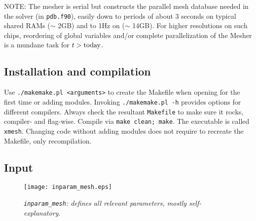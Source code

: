 \documentclass[11pt,letter,fleqn,english,notitlepage]{article}
\begin{document}
\noindent NOTE: The mesher is serial but constructs the parallel mesh database 
needed in the solver (in {\tt pdb.f90}), easily down to periods of about 
3 seconds on typical shared RAMs ($\sim$ 2GB) and to 1Hz on ($\sim$ 14GB). 
For higher resolutions on such chips, reordering of global variables and/or complete 
parallelization of the Mesher is a mundane task for $t>{\rm today}$.

\subsection{Installation and compilation}
Use {\tt ./makemake.pl <arguments>} to create the Makefile when opening for the
first time or adding modules.  Invoking {\tt ./makemake.pl -h} provides options
for different compilers. Always check the resultant {\tt Makefile} to make sure
it rocks, compiler- and flag-wise. Compile via {\tt make clean; make}. The
executable is called {\tt xmesh}.  Changing code without adding modules does
not require to recreate the Makefile, only recompilation.

\subsection{Input}
\begin{figure*}[htb]
\begin{center}
\texttt{[image: inparam\_mesh.eps]}
\caption{\textit{{\tt inparam\_mesh}: defines all relevant parameters, mostly self-explanatory. }}
\end{center}
\end{figure*}
\end{document}
